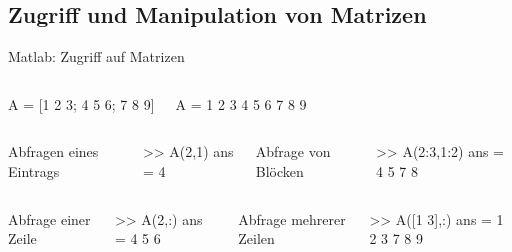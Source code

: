 \documentclass[hyperref={xetex}]{beamer}
\begin{document}
\subsection{Zugriff und Manipulation von Matrizen}
%
%
\begin{frame}[fragile]{Matlab: Zugriff auf Matrizen}
\begin{columns}[c]%
%
\begin{matlabin}[basicstyle=\tiny]
A = [1 2 3; 4 5 6; 7 8 9]
\end{matlabin}%
\begin{matlab}
A =
     1     2     3
     4     5     6
     7     8     9 
\end{matlab}%
\end{columns}%
\begin{columns}[t,onlytextwidth]
Abfragen eines Eintrags
\begin{matlabin}
>> A(2,1)
ans =
     4
\end{matlabin}
Abfrage von Blöcken
\begin{matlabin}
>> A(2:3,1:2)
ans =
     4     5     
     7     8     
\end{matlabin}
\end{columns}
\begin{columns}[t,onlytextwidth]
Abfrage einer Zeile
\begin{matlabin}
>> A(2,:)
ans =
     4     5     6
\end{matlabin}
Abfrage mehrerer Zeilen
\begin{matlabin}
>> A([1 3],:)
ans =
     1     2     3
     7     8     9
\end{matlabin}
\end{columns}
\end{frame}
\end{document}
